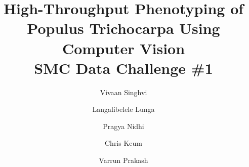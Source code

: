 \documentclass[final,5p,times,twocolumn,authoryear]{elsarticle}
\begin{document}
\begin{frontmatter}



\title{%
High-Throughput Phenotyping of Populus Trichocarpa Using Computer Vision \\
\large SMC Data Challenge \#1
}


\author[]{Vivaan Singhvi}
\author[]{Langalibelele Lunga}
\author[]{Pragya Nidhi}
\author[]{Chris Keum}
\author[]{Varrun Prakash}


\end{frontmatter}
\end{document}
